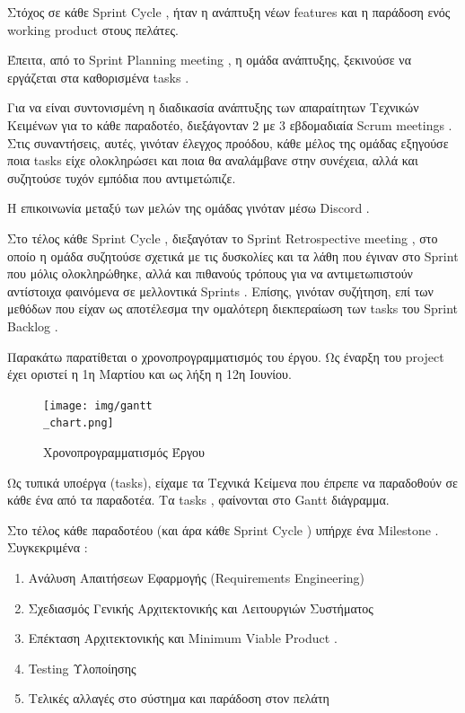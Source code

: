 \documentclass{../ol-softwaremanual}
\begin{document}
	Στόχος σε κάθε \en Sprint Cycle \gr , ήταν η ανάπτυξη νέων \en features \gr και η παράδοση ενός \en working product \gr στους πελάτες. \break
	
	Έπειτα, από το \en Sprint Planning meeting \gr, η ομάδα ανάπτυξης, ξεκινούσε να εργάζεται στα καθορισμένα \en tasks \gr . \break
	
	Για να είναι συντονισμένη η διαδικασία ανάπτυξης των απαραίτητων Τεχνικών Κειμένων για το κάθε παραδοτέο, διεξάγονταν 2 με 3 εβδομαδιαία \en Scrum meetings \gr . Στις συναντήσεις, αυτές, γινόταν έλεγχος προόδου, κάθε μέλος της ομάδας εξηγούσε ποια \en tasks \gr είχε ολοκληρώσει και ποια θα αναλάμβανε στην συνέχεια, αλλά και συζητούσε τυχόν εμπόδια που αντιμετώπιζε. \break
	
	Η επικοινωνία μεταξύ των μελών της ομάδας γινόταν μέσω \en Discord \gr. \break
	
	Στο τέλος κάθε \en Sprint Cycle \gr , διεξαγόταν το \en Sprint Retrospective meeting \gr , στο οποίο η ομάδα συζητούσε σχετικά με τις δυσκολίες και τα λάθη που έγιναν στο \en Sprint \gr που μόλις ολοκληρώθηκε, αλλά και πιθανούς τρόπους για να αντιμετωπιστούν αντίστοιχα φαινόμενα σε μελλοντικά \en Sprints \gr . Επίσης, γινόταν συζήτηση, επί των μεθόδων που είχαν ως αποτέλεσμα την ομαλότερη διεκπεραίωση των \en tasks \gr του \en Sprint Backlog \gr .
	
	\newpage
	
	
	\flushleft
	
	Παρακάτω παρατίθεται ο χρονοπρογραμματισμός του έργου. Ως έναρξη του \en project \gr έχει οριστεί η 1η Μαρτίου και ως λήξη η 12η Ιουνίου. 
	
	
	\begin{figure}[htbp!]
		
		\texttt{[image: img/gantt\\\_chart.png]}
		\caption{Χρονοπρογραμματισμός Έργου}
		
		
	\end{figure}
	
	Ως τυπικά υποέργα (\en tasks\gr), είχαμε τα Τεχνικά Κείμενα που έπρεπε να παραδοθούν σε κάθε ένα από τα παραδοτέα. Τα \en tasks \gr, φαίνονται στο \en Gantt \gr διάγραμμα. \break
	
	Στο τέλος κάθε παραδοτέου (και άρα κάθε \en Sprint Cycle \gr) υπήρχε ένα \en Milestone \gr. Συγκεκριμένα :
	
	\begin{enumerate}
		\item Ανάλυση Απαιτήσεων Εφαρμογής (\en Requirements Engineering\gr)
		\item Σχεδιασμός Γενικής Αρχιτεκτονικής και Λειτουργιών Συστήματος
		\item  Επέκταση Αρχιτεκτονικής και \en Minimum Viable Product \gr.
		\item \en Testing \gr Υλοποίησης
		\item Τελικές αλλαγές στο σύστημα και παράδοση στον πελάτη
	\end{enumerate}
	\newpage
	
\end{document}
